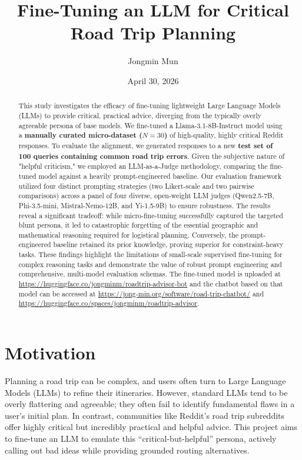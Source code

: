 \documentclass[12pt]{article}
\title{Fine-Tuning an LLM for Critical Road Trip Planning}
\author{Jongmin Mun \\ }
\date{April 30, 2026}
\begin{document}
\maketitle

\begin{abstract}
This study investigates the efficacy of fine-tuning lightweight Large Language Models (LLMs) to provide critical, practical advice, diverging from the typically overly agreeable persona of base models. We fine-tuned a Llama-3.1-8B-Instruct model using a \textbf{manually curated micro-dataset ($N=30$)} of high-quality, highly critical Reddit responses. To evaluate the alignment, we generated responses to a new \textbf{test set of 100 queries containing common road trip errors}. Given the subjective nature of "helpful criticism," we employed an LLM-as-a-Judge methodology, comparing the fine-tuned model against a heavily prompt-engineered baseline. Our evaluation framework utilized four distinct prompting strategies (two Likert-scale and two pairwise comparisons) across a panel of four diverse, open-weight LLM judges (Qwen2.5-7B, Phi-3.5-mini, Mistral-Nemo-12B, and Yi-1.5-9B) to ensure robustness. The results reveal a significant tradeoff: while micro-fine-tuning successfully captured the targeted blunt persona, it led to catastrophic forgetting of the essential geographic and mathematical reasoning required for logistical planning. Conversely, the prompt-engineered baseline retained its prior knowledge, proving superior for constraint-heavy tasks. These findings highlight the limitations of small-scale supervised fine-tuning for complex reasoning tasks and demonstrate the value of robust prompt engineering and comprehensive, multi-model evaluation schemas. The fine-tuned model is uploaded at \url{https://huggingface.co/jongminm/roadtrip-advisor-bot} and the chatbot based on that model can be accessed at \url{https://jong-min.org/software/road-trip-chatbot/} and \url{https://huggingface.co/spaces/jongminm/roadtrip-advisor}. 
\end{abstract}

\section{Motivation}
Planning a road trip can be complex, and users often turn to Large Language Models (LLMs) to refine their itineraries. However, standard LLMs tend to be overly flattering and agreeable; they often fail to identify fundamental flaws in a user's initial plan. In contrast, communities like Reddit's road trip subreddits offer highly critical but incredibly practical and helpful advice. This project aims to fine-tune an LLM to emulate this ``critical-but-helpful'' persona, actively calling out bad ideas while providing grounded routing alternatives.
\end{document}
